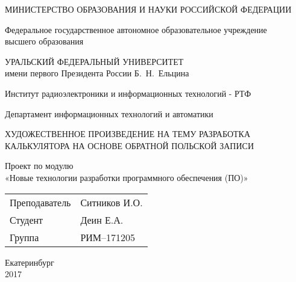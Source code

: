 \begin{titlepage}
\begin{center}
  \noindent  МИНИСТЕРСТВО ОБРАЗОВАНИЯ И НАУКИ РОССИЙСКОЙ ФЕДЕРАЦИИ
  \par \vspace{0.5cm}
  \noindent Федеральное государственное автономное образовательное учреждение\\
  высшего образования\\
  \par \vspace{0.3cm}
  \noindent УРАЛЬСКИЙ ФЕДЕРАЛЬНЫЙ УНИВЕРСИТЕТ\\
  \noindent имени первого Президента России Б.~Н.~Ельцина\\
  \par \vspace{0.3cm}
  \noindent  Институт радиоэлектроники и информационных технологий - РТФ\\
  \par \vspace{0.3cm}
  \noindent  Департамент информационных технологий и автоматики \\

  \par \vspace{1cm}
  \noindent \MakeUppercase{художественное произведение на тему разработка калькулятора на основе обратной польской записи} \normalsize
  \par \vspace{0.5cm}

  \noindent Проект по модулю \\
  «Новые технологии разработки программного обеспечения (ПО)»
  \par \vspace{0.3cm}
\end{center}

\vspace{1.0cm}
\bigskip
\vfill      
\begin{tabular}{p{}p{}}
  Преподаватель & \hspace{4cm} Ситников И.О. \\
  Студент & \hspace{4cm} Деин Е.А. \\
  Группа & \hspace{4cm} РИМ--171205 \\
\end{tabular}
\vfill

\begin{center}
  Екатеринбург \\
  2017
\end{center}
\end{titlepage}